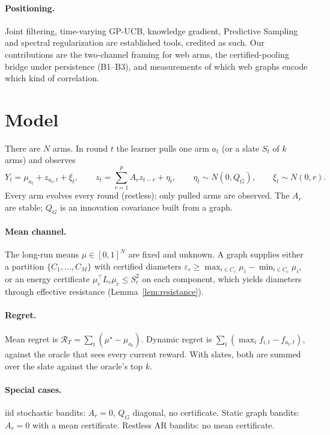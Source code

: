 \documentclass[11pt]{article}
\theoremstyle{definition}
\theoremstyle{remark}
\begin{document}
\paragraph{Positioning.} Joint filtering, time-varying GP-UCB, knowledge gradient, Predictive Sampling and spectral regularization are established tools, credited as such. Our contributions are the two-channel framing for web arms, the certified-pooling bridge under persistence (B1--B3), and measurements of which web graphs encode which kind of correlation.

\section{Model}\label{sec:model}

There are $N$ arms. In round $t$ the learner pulls one arm $a_t$ (or a slate $S_t$ of $k$ arms) and observes
\begin{equation}
Y_t=\mu_{a_t}+z_{a_t,t}+\xi_t,\qquad z_t=\sum_{r=1}^{p}A_r z_{t-r}+\eta_t,\qquad \eta_t\sim N(0,Q_G),\qquad \xi_t\sim N(0,r).
\end{equation}
Every arm evolves every round (restless); only pulled arms are observed. The $A_r$ are stable; $Q_G$ is an innovation covariance built from a graph.

\paragraph{Mean channel.} The long-run means $\mu\in[0,1]^N$ are fixed and unknown. A graph supplies either a partition $\{C_1,\dots,C_M\}$ with certified diameters $\varepsilon_c\ge\max_{i\in C_c}\mu_i-\min_{i\in C_c}\mu_i$, or an energy certificate $\mu_c^\top L_c\mu_c\le S_c^2$ on each component, which yields diameters through effective resistance (Lemma~\ref{lem:resistance}).

\paragraph{Regret.} Mean regret is $\mathcal R_T=\sum_t(\mu^\star-\mu_{a_t})$. Dynamic regret is $\sum_t(\max_i f_{i,t}-f_{a_t,t})$, against the oracle that sees every current reward. With slates, both are summed over the slate against the oracle's top $k$.

\paragraph{Special cases.} iid stochastic bandits: $A_r=0$, $Q_G$ diagonal, no certificate. Static graph bandits: $A_r=0$ with a mean certificate. Restless AR bandits: no mean certificate.
\end{document}
